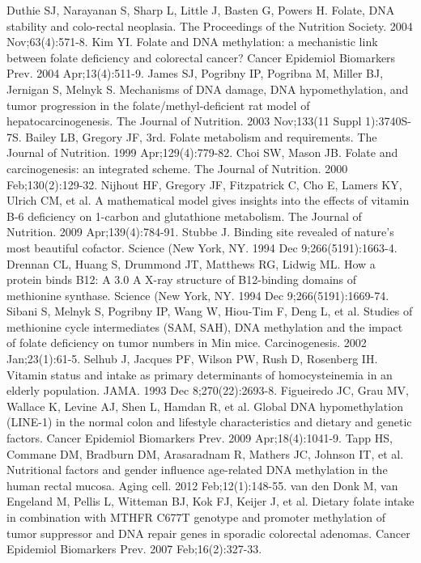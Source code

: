 \begin{thebibliography}{12}
		Duthie SJ, Narayanan S, Sharp L, Little J, Basten G, Powers H. Folate, DNA stability and colo-rectal neoplasia. The Proceedings of the Nutrition Society. 2004 Nov;63(4):571-8. 
		Kim YI. Folate and DNA methylation: a mechanistic link between folate deficiency and colorectal cancer? Cancer Epidemiol Biomarkers Prev. 2004 Apr;13(4):511-9. 
		James SJ, Pogribny IP, Pogribna M, Miller BJ, Jernigan S, Melnyk S. Mechanisms of DNA damage, DNA hypomethylation, and tumor progression in the folate/methyl-deficient rat model of hepatocarcinogenesis. The Journal of Nutrition. 2003 Nov;133(11 Suppl 1):3740S-7S. 
		Bailey LB, Gregory JF, 3rd. Folate metabolism and requirements. The Journal of Nutrition. 1999 Apr;129(4):779-82. 
		Choi SW, Mason JB. Folate and carcinogenesis: an integrated scheme. The Journal of Nutrition. 2000 Feb;130(2):129-32. 
		Nijhout HF, Gregory JF, Fitzpatrick C, Cho E, Lamers KY, Ulrich CM, et al. A mathematical model gives insights into the effects of vitamin B-6 deficiency on 1-carbon and glutathione metabolism. The Journal of Nutrition. 2009 Apr;139(4):784-91. 
		Stubbe J. Binding site revealed of nature's most beautiful cofactor. Science (New York, NY. 1994 Dec 9;266(5191):1663-4. 
		Drennan CL, Huang S, Drummond JT, Matthews RG, Lidwig ML. How a protein binds B12: A 3.0 A X-ray structure of B12-binding domains of methionine synthase. Science (New York, NY. 1994 Dec 9;266(5191):1669-74. 
		Sibani S, Melnyk S, Pogribny IP, Wang W, Hiou-Tim F, Deng L, et al. Studies of methionine cycle intermediates (SAM, SAH), DNA methylation and the impact of folate deficiency on tumor numbers in Min mice. Carcinogenesis. 2002 Jan;23(1):61-5. 
		Selhub J, Jacques PF, Wilson PW, Rush D, Rosenberg IH. Vitamin status and intake as primary determinants of homocysteinemia in an elderly population. JAMA. 1993 Dec 8;270(22):2693-8. 
		Figueiredo JC, Grau MV, Wallace K, Levine AJ, Shen L, Hamdan R, et al. Global DNA hypomethylation (LINE-1) in the normal colon and lifestyle characteristics and dietary and genetic factors. Cancer Epidemiol Biomarkers Prev. 2009 Apr;18(4):1041-9. 
		Tapp HS, Commane DM, Bradburn DM, Arasaradnam R, Mathers JC, Johnson IT, et al. Nutritional factors and gender influence age-related DNA methylation in the human rectal mucosa. Aging cell. 2012 Feb;12(1):148-55. 
		van den Donk M, van Engeland M, Pellis L, Witteman BJ, Kok FJ, Keijer J, et al. Dietary folate intake in combination with MTHFR C677T genotype and promoter methylation of tumor suppressor and DNA repair genes in sporadic colorectal adenomas. Cancer Epidemiol Biomarkers Prev. 2007 Feb;16(2):327-33. 

\end{thebibliography}
